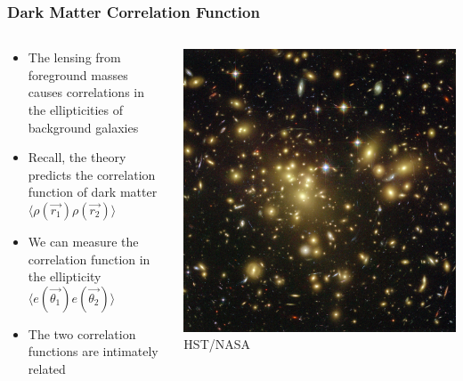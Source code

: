 \documentclass{beamer}
\begin{document}
\frame
{

    \frametitle{Dark Matter Correlation Function}


    \begin{columns}
        \begin{column}{0.5\textwidth}
            \begin{itemize}

                \item The lensing from foreground masses
                    causes correlations in the ellipticities of background
                    galaxies

                \item Recall, the theory predicts the correlation function of
                    dark matter {\color{gold} $\langle \rho(\vec{r_1}) \rho(\vec{r_2})
                    \rangle$ }

                \item We can measure the correlation function in the
                    ellipticity {\color{gold} $\langle e(\vec{\theta_1})
                    e(\vec{\theta_2}) \rangle$ }

                \item The two correlation functions are intimately related

            \end{itemize}

        \end{column}
        \begin{column}{0.5\textwidth}
            \begin{center}
                \includegraphics[width=\textwidth]{abell-1689-hubble.jpg}
                \newline
                {\tiny HST/NASA}
            \end{center}
        \end{column}


\end{columns}}
\end{document}
